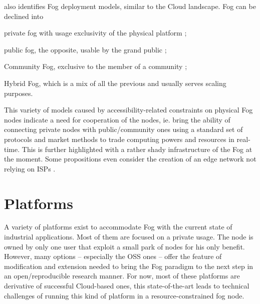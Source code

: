 \documentclass[11pt]{sdm}
\begin{document}
\citet{ahmed_fog_2019} also identifies Fog deployment models, similar to the Cloud landscape. Fog can be declined into
\begin{enumerate*}[(a)]
	\item private fog with usage exclusivity of the physical platform ;
	\item public fog, the opposite, usable by the grand public ;
	\item Community Fog, exclusive to the member of a community ;
	\item Hybrid Fog, which is a mix of all the previous and usually serves scaling purposes.
\end{enumerate*}
This variety of models caused by accessibility-related constraints on physical Fog nodes indicate a need for cooperation of the nodes, ie. bring the ability of connecting private nodes with public/community ones using a standard set of protocols and market methods to trade computing powers and resources in real-time. This is further highlighted with a rather shady infrastructure of the Fog at the moment. Some propositions even consider the creation of an edge network not relying on \glspl{ISP} \cite{bermbach_towards_2021}.

\section{Platforms}

A variety of platforms exist to accommodate Fog with the current state of industrial applications. Most of them are focused on a private usage. The node is owned by only one user that exploit a small park of nodes for his only benefit. However, many options -- especially the \gls{OSS} ones -- offer the feature of modification and extension needed to bring the Fog paradigm to the next step in an open/reproducible research manner. For now, most of these platforms are derivative of successful Cloud-based ones, this state-of-the-art leads to technical challenges of running this kind of platform in a resource-constrained fog node.

\end{document}
